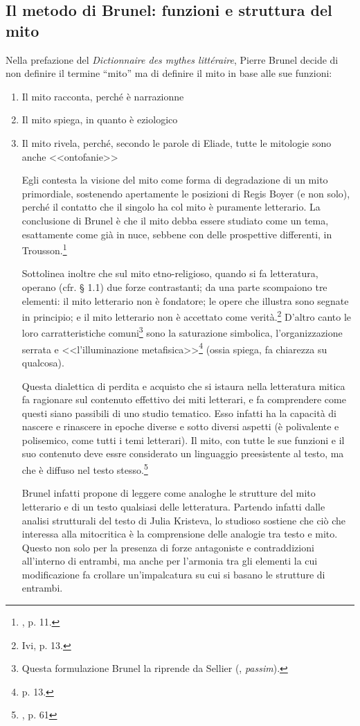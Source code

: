 \documentclass[12pt,a4paper,openright, oneside]{book}
\begin{document}
\subsection{Il metodo di Brunel: funzioni e struttura del mito}
Nella prefazione del \textit{Dictionnaire des mythes littéraire}, Pierre Brunel decide di non definire il termine ``mito'' ma di definire il mito in base alle sue funzioni:
\begin{enumerate}
\item Il mito racconta, perché è narrazionne
\item Il mito spiega, in quanto è eziologico
\item Il mito rivela, perché, secondo le parole di Eliade, tutte le mitologie sono anche <<ontofanie>>

Egli contesta la visione del mito come forma di degradazione di un mito primordiale, sostenendo apertamente le posizioni di Regis Boyer (e non solo), perché il contatto che il singolo ha col mito è puramente letterario. La conclusione di Brunel è che il mito debba essere studiato come un tema, esattamente come già in nuce, sebbene con delle prospettive differenti, in Trousson.\footnote{\cite{Brunel4}, p. 11.}

Sottolinea inoltre che sul mito etno-religioso, quando si fa letteratura, operano (cfr. § 1.1) due forze contrastanti; da una parte scompaiono tre elementi: il mito letterario non è fondatore; le opere che illustra sono segnate in principio; e il mito letterario non è accettato come verità.\footnote{Ivi, p. 13.} D'altro canto le loro carratteristiche comuni\footnote{Questa formulazione Brunel la riprende da Sellier (\cite{Sellier}, \textit{passim}).} sono la saturazione simbolica, l'organizzazione serrata e <<l'illuminazione metafisica>>\footnote{\cite{Brunel4} p. 13.} (ossia spiega, fa chiarezza su qualcosa).



Questa dialettica di perdita e acquisto che si istaura nella letteratura mitica fa ragionare sul contenuto effettivo dei miti letterari, e fa comprendere come questi siano passibili di uno studio tematico. Esso infatti ha la capacità di nascere e rinascere in epoche diverse e sotto diversi aspetti (è polivalente e polisemico, come tutti i temi letterari). Il mito, con tutte le sue funzioni e il suo contenuto deve essre considerato un linguaggio preesistente al testo, ma che è diffuso nel testo stesso.\footnote{\cite{Brunel1}, p. 61}

Brunel infatti propone di leggere come analoghe le strutture del mito letterario e di un testo qualsiasi delle letteratura. Partendo infatti dalle analisi strutturali del testo di Julia Kristeva, lo studioso sostiene che ciò che interessa alla mitocritica è la comprensione delle analogie tra testo e mito. Questo non solo per la presenza di forze antagoniste e contraddizioni all'interno di entrambi, ma anche per l'armonia tra gli elementi la cui modificazione fa crollare un'impalcatura su cui si basano le strutture di entrambi.

\end{enumerate}
\end{document}
